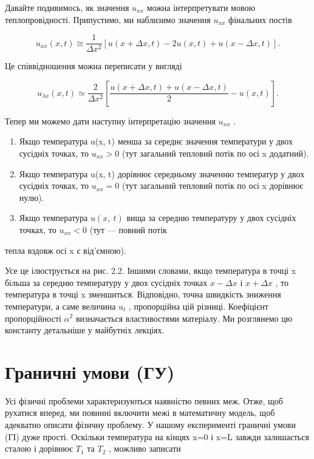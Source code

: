 Давайте подивимось, як значення \(u_{xx}\) можна інтерпретувати мовою теплопровідності. Припустимо, ми наблизимо значення \(u_{xx}\) фінальних постів

\[u_{xx}(x, t) \cong \frac{1}{\Delta x^2} [u(x + \Delta x, t) - 2u(x, t) + u(x - \Delta x, t)].\]

Це співвідношення можна переписати у вигляді

\[u_{\lambda x}(x, t) \simeq \frac{2}{\Delta x^2} \left[ \frac{u(x + \Delta x, t) + u(x - \Delta x, t)}{2} - u(x, t) \right].\]

Тепер ми можемо дати наступну інтерпретацію значення \(u_{xx}\) .

\begin{enumerate}
\def\labelenumi{\arabic{enumi}.}
\item
  Якщо температура u(x, t) менша за середнє значення температури у двох сусідніх точках, то \(u_{xx} > 0\) (тут загальний тепловий потік по осі x додатний).
\item
  Якщо температура u(x, t) дорівнює середньому значенню температур у двох сусідніх точках, то \(u_{xx} = 0\) (тут загальний тепловий потік по осі x дорівнює нулю).
\item
  Якщо температура \(u\left(x,\ t\right)\) вища за середню температуру у двох сусідніх точках, то \(u_{xx}<0\) (тут --- повний потік
\end{enumerate}

тепла вздовж осі x є від'ємною).

Усе це ілюструється на рис. 2.2. Іншими словами, якщо температура в точці x більша за середню температуру у двох сусідніх точках \(x - \Delta x\) і \(x + \Delta x\) , то температура в точці x зменшиться. Відповідно, точна швидкість зниження температури, а саме величина \(u_t\) , пропорційна цій різниці. Коефіцієнт пропорційності \(\alpha^2\) визначається властивостями матеріалу. Ми розглянемо цю константу детальніше у майбутніх лекціях.

\section{Граничні умови (ГУ)}\label{ux433ux440ux430ux43dux438ux447ux43dux456-ux443ux43cux43eux432ux438-ux433ux443}

Усі фізичні проблеми характеризуються наявністю певних меж. Отже, щоб рухатися вперед, ми повинні включити межі в математичну модель, щоб адекватно описати фізичну проблему. У нашому експерименті граничні умови (ГІ) дуже прості. Оскільки температура на кінцях x=0 і x=L завжди залишається сталою і дорівнює \(T_1\) та \(T_2\) , можливо записати

